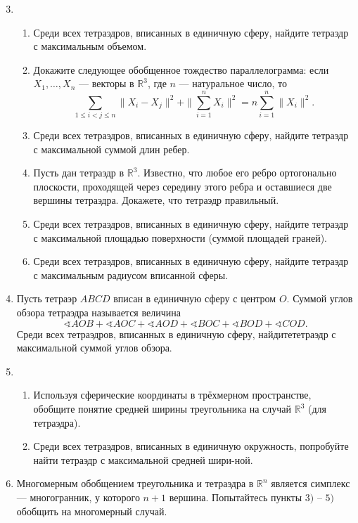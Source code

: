 \begin{enumerate} \setcounter{enumi}{2}
\item
\begin{enumerate}
\item Среди всех тетраэдров, вписанных в единичную сферу, найдите тетраэдр с максимальным объемом.
\item Докажите следующее обобщенное тождество параллелограмма: если $X_1,\dots, X_n$ --- векторы в $\mathbb R^3$, где $n$ --- натуральное число, то
$$
\sum_{1\leq i<j\leq n}\|X_i-X_j\|^2+\|\sum_{i=1}^n X_i\|^2=n\sum_{i=1}^n\| X_i\|^2.
$$
\item Среди всех тетраэдров, вписанных в единичную сферу, найдите тетраэдр с максимальной суммой длин ребер.
\item Пусть дан тетраэдр в $\mathbb R^3$. Известно, что любое его ребро ортогонально плоскости, проходящей через середину этого ребра и оставшиеся две вершины тетраэдра. Докажете, что тетраэдр правильный.
\item Среди всех тетраэдров, вписанных в единичную сферу, найдите тетраэдр  с максимальной площадью поверхности (суммой площадей граней).
\item Среди всех тетраэдров, вписанных в единичную сферу, найдите тетраэдр  с максимальным радиусом вписанной сферы.
\end{enumerate}
\item Пусть тетраэр $ABCD$ вписан в единичную сферу с центром $O$. Суммой углов обзора тетраэдра называется величина
\[
\sphericalangle AOB+\sphericalangle AOC+\sphericalangle AOD+\sphericalangle BOC+\sphericalangle BOD+\sphericalangle COD.
\]
Среди всех тетраэдров, вписанных в единичную сферу, найдите\linebreak  тетраэдр с максимальной суммой углов обзора.
\item
\begin{enumerate}
\item Используя сферические координаты в трёхмерном пространстве, обобщите понятие средней ширины треугольника на случай $\mathbb R^3$ (для тетраэдра).
\item Среди всех тетраэдров, вписанных в единичную окружность, попробуйте найти тетраэдр  с максимальной средней шири-\linebreak ной.
\end{enumerate}
\item Многомерным обобщением треугольника и тетраэдра в $\mathbb R^n$ является симплекс --- многогранник, у которого $n+1$ вершина. Попытайтесь пункты $3)$ -- $5)$ обобщить на многомерный случай.
\end{enumerate}

